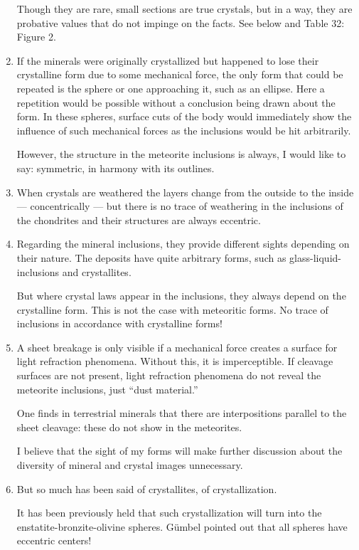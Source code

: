 \documentclass[a4paper, 12pt, oneside]{article}
\begin{document}
\begin{enumerate}
    Though they are rare, small sections are true crystals, but in a way, they are probative values that do not impinge on the facts. See below and Table 32: Figure 2.
    \item If the minerals were originally crystallized but happened to lose their crystalline form due to some mechanical force, the only form that could be repeated is the sphere or one approaching it, such as an ellipse. Here a repetition would be possible without a conclusion being drawn about the form. In these spheres, surface cuts of the body would immediately show the influence of such mechanical forces as the inclusions would be hit arbitrarily.
    
    However, the structure in the meteorite inclusions is always, I would like to say: symmetric, in harmony with its outlines.
    \item When crystals are weathered the layers change from the outside to the inside --- concentrically --- but there is no trace of weathering in the inclusions of the chondrites and their structures are always eccentric.
    \item Regarding the mineral inclusions, they provide different sights depending on their nature. The deposits have quite arbitrary forms, such as glass-liquid-inclusions and crystallites.
    
    But where crystal laws appear in the inclusions, they always depend on the crystalline form. This is not the case with meteoritic forms. No trace of inclusions in accordance with crystalline forms!
    \item A sheet breakage is only visible if a mechanical force creates a surface for light refraction phenomena. Without this, it is imperceptible. If cleavage surfaces are not present, light refraction phenomena do not reveal the meteorite inclusions, just ``dust material.''
    
    One finds in terrestrial minerals that there are interpositions parallel to the sheet cleavage: these do not show in the meteorites.
    
    I believe that the sight of my forms will make further discussion about the diversity of mineral and crystal images unnecessary.
    \item But so much has been said of crystallites, of crystallization.
    
    It has been previously held that such crystallization will turn into the enstatite-bronzite-olivine spheres. Gümbel pointed out that all spheres have eccentric centers!
    

\end{enumerate}
\end{document}
